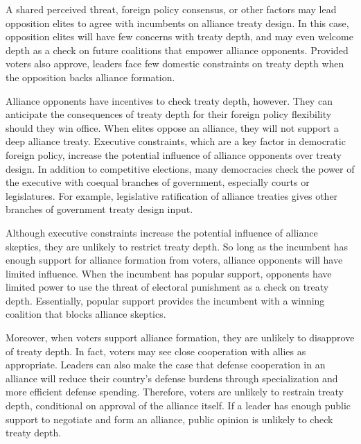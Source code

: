 \documentclass[12pt]{article}
\begin{document}
A shared perceived threat, foreign policy consensus, or other factors may lead opposition elites to agree with incumbents on alliance treaty design. 
In this case, opposition elites will have few concerns with treaty depth, and may even welcome depth as a check on future coalitions that empower alliance opponents. 
Provided voters also approve, leaders face few domestic constraints on treaty depth when the opposition backs alliance formation. 


Alliance opponents have incentives to check treaty depth, however.
They can anticipate the consequences of treaty depth for their foreign policy flexibility should they win office.
When elites oppose an alliance, they will not support a deep alliance treaty.  
Executive constraints, which are a key factor in democratic foreign policy, increase the potential influence of alliance opponents over treaty design.   
In addition to competitive elections, many democracies check the power of the executive with coequal branches of government, especially courts or legislatures.
For example, legislative ratification of alliance treaties gives other branches of government treaty design input. 


Although executive constraints increase the potential influence of alliance skeptics, they are unlikely to restrict treaty depth. 
So long as the incumbent has enough support for alliance formation from voters, alliance opponents will have limited influence. 
When the incumbent has popular support, opponents have limited power to use the threat of electoral punishment as a check on treaty depth. 
Essentially, popular support provides the incumbent with a winning coalition that blocks alliance skeptics. 




Moreover, when voters support alliance formation, they are unlikely to disapprove of treaty depth.
In fact, voters may see close cooperation with allies as appropriate. 
Leaders can also make the case that defense cooperation in an alliance will reduce their country's defense burdens through specialization and more efficient defense spending.  
Therefore, voters are unlikely to restrain treaty depth, conditional on approval of the alliance itself. 
If a leader has enough public support to negotiate and form an alliance, public opinion is unlikely to check treaty depth. 
\end{document}
